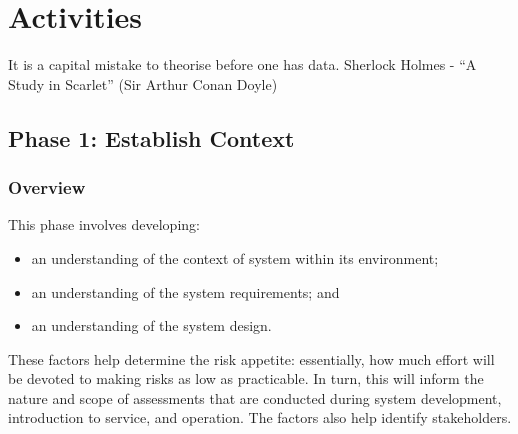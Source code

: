 %
%
\cbstart\chapter{Activities}\label{bkm:activitiestailoring}\cbend
\dsiwgSectionQuote
  {It is a capital mistake to theorise before one has data.}
  {Sherlock Holmes - ``A Study in Scarlet'' (Sir Arthur Conan Doyle)}


\section{Phase 1: Establish Context}
\subsection{Overview}
This phase involves developing:
\begin{itemize}
	\item an understanding of the context of system within its environment; 
	\item an understanding of the system requirements; and 
	\item an understanding of the system design.
\end{itemize}

These factors help determine the risk appetite: essentially, how much effort will be devoted to making risks as low as practicable. In turn, this will inform the nature and scope of assessments that are conducted during system development, introduction to service, and operation. The factors also help identify \glspl{stakeholder}.

